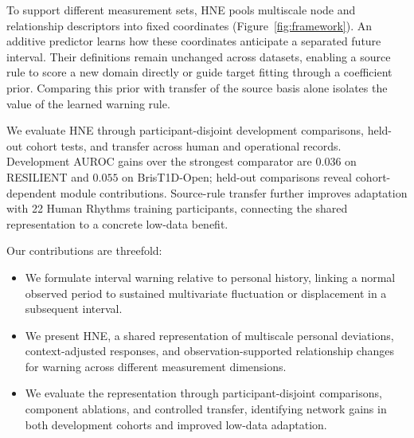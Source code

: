 To support different measurement sets, HNE pools multiscale node and relationship descriptors into fixed coordinates (Figure~\ref{fig:framework}). An additive predictor learns how these coordinates anticipate a separated future interval. Their definitions remain unchanged across datasets, enabling a source rule to score a new domain directly or guide target fitting through a coefficient prior. Comparing this prior with transfer of the source basis alone isolates the value of the learned warning rule.

We evaluate HNE through participant-disjoint development comparisons, held-out cohort tests, and transfer across human and operational records. Development AUROC gains over the strongest comparator are $0.036$ on RESILIENT and $0.055$ on BrisT1D-Open; held-out comparisons reveal cohort-dependent module contributions. Source-rule transfer further improves adaptation with 22 Human Rhythms training participants, connecting the shared representation to a concrete low-data benefit.

Our contributions are threefold:
\begin{itemize}
\item We formulate interval warning relative to personal history, linking a normal observed period to sustained multivariate fluctuation or displacement in a subsequent interval.
\item We present HNE, a shared representation of multiscale personal deviations, context-adjusted responses, and observation-supported relationship changes for warning across different measurement dimensions.
\item We evaluate the representation through participant-disjoint comparisons, component ablations, and controlled transfer, identifying network gains in both development cohorts and improved low-data adaptation.
\end{itemize}
